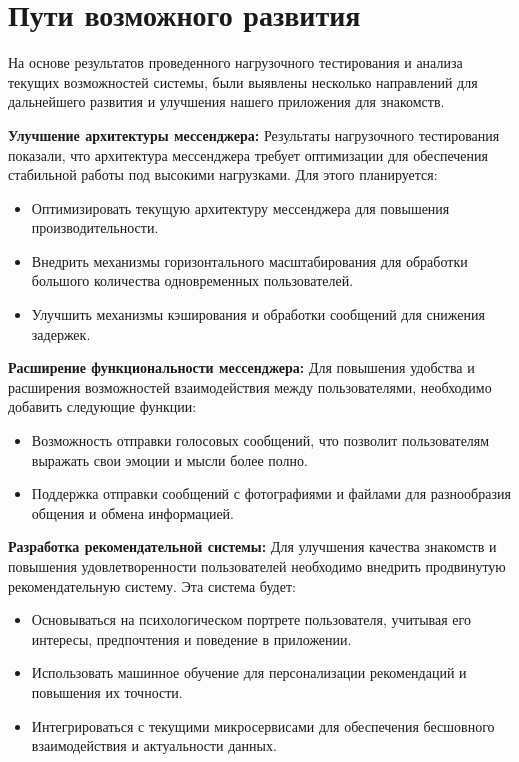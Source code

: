 \section{Пути возможного развития}

На основе результатов проведенного нагрузочного тестирования и анализа текущих возможностей системы, были выявлены несколько направлений для дальнейшего развития и улучшения нашего приложения для знакомств.

\textbf{Улучшение архитектуры мессенджера:}
Результаты нагрузочного тестирования показали, что архитектура мессенджера требует оптимизации для обеспечения стабильной работы под высокими нагрузками. Для этого планируется:
\begin{itemize}
    \item Оптимизировать текущую архитектуру мессенджера для повышения производительности.
    \item Внедрить механизмы горизонтального масштабирования для обработки большого количества одновременных пользователей.
    \item Улучшить механизмы кэширования и обработки сообщений для снижения задержек.
\end{itemize}

\textbf{Расширение функциональности мессенджера:}
Для повышения удобства и расширения возможностей взаимодействия между пользователями, необходимо добавить следующие функции:
\begin{itemize}
    \item Возможность отправки голосовых сообщений, что позволит пользователям выражать свои эмоции и мысли более полно.
    \item Поддержка отправки сообщений с фотографиями и файлами для разнообразия общения и обмена информацией.
\end{itemize}

\textbf{Разработка рекомендательной системы:}
Для улучшения качества знакомств и повышения удовлетворенности пользователей необходимо внедрить продвинутую рекомендательную систему. Эта система будет:
\begin{itemize}
    \item Основываться на психологическом портрете пользователя, учитывая его интересы, предпочтения и поведение в приложении.
    \item Использовать машинное обучение для персонализации рекомендаций и повышения их точности.
    \item Интегрироваться с текущими микросервисами для обеспечения бесшовного взаимодействия и актуальности данных.
\end{itemize}

